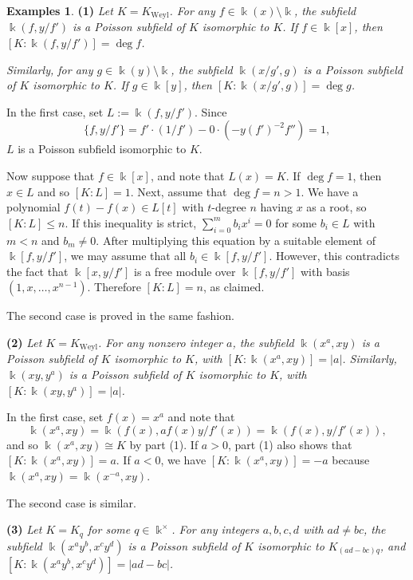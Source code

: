 \documentclass[12pt]{amsart}
\theoremstyle{plain}
\numberwithin{theorem}{section}
\numberwithin{equation}{theorem}
\theoremstyle{definition}
\newtheorem{examples}[theorem]{Examples}
\DeclareMathOperator{\Weyl}{Weyl}
\newcommand \Kweyl {K_{\Weyl}}
\newcommand \kx {\Bbbk^\times}
\begin{document}
\begin{examples}  
\label{zzexa1.5}  
\textbf{(1)} 
\emph{Let $K = \Kweyl$. For any $f \in \Bbbk(x) \setminus \Bbbk$, 
the subfield $\Bbbk(f,y/f')$ is a Poisson subfield of $K$ 
isomorphic to $K$. If $f \in \Bbbk[x]$, then 
$[K:\Bbbk(f,y/f')] = \deg f$.}

\emph{Similarly, for any $g \in \Bbbk(y) \setminus \Bbbk$, the 
subfield $\Bbbk(x/g',g)$ is a Poisson subfield of $K$ 
isomorphic to $K$. If $g\in \Bbbk[y]$, then 
$[K:\Bbbk(x/g',g)] = \deg g$.}

In the first case, set $L := \Bbbk(f,y/f')$. Since 
$$
\{f,y/f'\} = f'\cdot (1/f') - 0\cdot (- y (f')^{-2} f'') = 1,
$$
$L$ is a Poisson subfield isomorphic to $K$. 

Now suppose that $f \in \Bbbk[x]$, and note that $L(x) = K$. 
If $\deg f = 1$, then $x \in L$ and so $[K:L] = 1$. Next, 
assume that $\deg f = n > 1$. We have a polynomial 
$f(t) - f(x) \in L[t]$ with $t$-degree $n$ having $x$ as a 
root, so $[K:L] \le n$. If this inequality is strict, 
$\sum_{i=0}^m b_i x^i = 0$ for some $b_i \in L$ with $m < n$ 
and $b_m \ne 0$. After multiplying this equation by a suitable 
element of $\Bbbk[f,y/f']$, we may assume that all 
$b_i \in \Bbbk[f,y/f']$. However, this contradicts the fact 
that $\Bbbk[x,y/f']$ is a free module over $\Bbbk[f,y/f']$ 
with basis $(1,x,\dots,x^{n-1})$. Therefore $[K:L] = n$, as 
claimed.

The second case is proved in the same fashion.

\textbf{(2)}
\emph{Let $K = \Kweyl$. For any nonzero integer $a$, the 
subfield $\Bbbk(x^a,xy)$ is a Poisson subfield of $K$ 
isomorphic to $K$, with $[K:\Bbbk(x^a,xy)] = |a|$. 
Similarly, $\Bbbk(xy,y^a)$ is a Poisson subfield of $K$ 
isomorphic to $K$, with $[K:\Bbbk(xy,y^a)] = |a|$.}

In the first case, set $f(x) = x^a$ and note that
$$
\Bbbk(x^a,xy) = \Bbbk(f(x), af(x)y/f'(x)) 
= \Bbbk(f(x), y/f'(x)),
$$
and so $\Bbbk(x^a,xy) \cong K$ by part (1). If $a>0$, 
part (1) also shows that  $[K:\Bbbk(x^a,xy)] = a$. If 
$a<0$, we have $[K:\Bbbk(x^a,xy)] = - a$ because 
$\Bbbk(x^a,xy) = \Bbbk(x^{-a},xy)$.

The second case is similar.

\textbf{(3)}
\emph{Let $K = K_q$ for some $q \in \kx$. For any 
integers $a,b,c,d$ with $ad \ne bc$, the subfield 
$\Bbbk(x^ay^b, x^cy^d)$ is a Poisson subfield of $K$ 
isomorphic to $K_{(ad-bc)q}$, and 
$[K: \Bbbk(x^ay^b, x^cy^d)] = |ad-bc|$.}


\end{examples}
\end{document}

